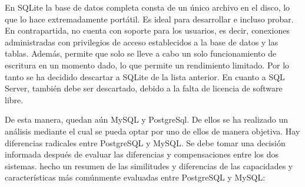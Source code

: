 \documentclass[11pt,oneside]{book}
\begin{document}
En SQLite la base de datos completa consta de un único archivo en el disco, lo que lo hace extremadamente portátil. Es ideal para desarrollar e incluso probar. En contrapartida, no cuenta con soporte para los usuarios, es decir, conexiones administradas con privilegios de acceso establecidos a la base de datos y las tablas. Además, permite que solo se lleve a cabo un solo funcionamiento de escritura en un momento dado, lo que permite un rendimiento limitado. Por lo tanto se ha decidido descartar a SQLite de la lista anterior. En cuanto a SQL Server, también debe ser descartado, debido a la falta de licencia de software libre.

\newpage
De esta manera, quedan aún MySQL y PostgreSql. De ellos se ha realizado un análisis mediante el cual se pueda optar por uno de ellos de manera objetiva. Hay diferencias radicales entre PostgreSQL y MySQL. Se debe tomar una decisión informada después de evaluar las diferencias y compensaciones entre los dos sistemas. hecho un resumen de las similitudes y diferencias de las capacidades y características más comúnmente evaluadas entre PostgreSQL y MySQL:
\end{document}
